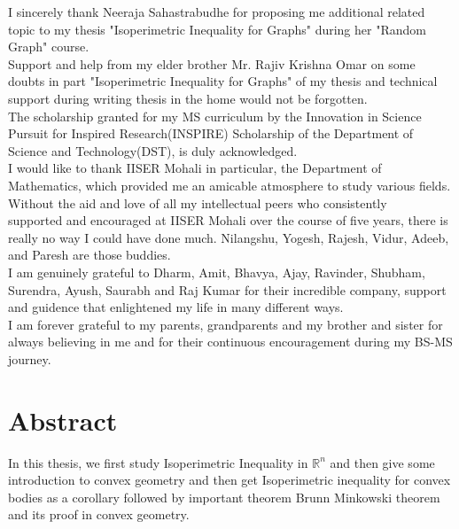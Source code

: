 \documentclass[oneside]{book}
\begin{document}
I sincerely thank Neeraja Sahastrabudhe for proposing me additional related topic to my thesis "Isoperimetric Inequality for Graphs"  during her "Random Graph" course. \\

Support and help from my elder brother Mr. Rajiv Krishna Omar on some doubts in part "Isoperimetric Inequality for Graphs" of my thesis and technical support during writing thesis in the home would not be forgotten.\\

The scholarship granted for my MS curriculum by the Innovation in Science Pursuit for Inspired Research(INSPIRE) Scholarship of the Department of Science and Technology(DST), is duly acknowledged.\\


I would like to thank IISER Mohali in particular, the Department of Mathematics, which provided me an amicable atmosphere to study various fields. \\

Without the aid and love of all my intellectual peers who consistently \\supported and encouraged at IISER Mohali over the course of five years, there is really no way I could have done much. Nilangshu, Yogesh, Rajesh, Vidur, Adeeb, and Paresh are those buddies. 
\\

I am genuinely grateful to Dharm, Amit, Bhavya, Ajay, Ravinder, Shubham, Surendra, Ayush, Saurabh and Raj Kumar for their incredible company,
support and guidence that enlightened my life in many different ways.\\
 
I am forever grateful to my parents, grandparents and my brother and sister for always believing in me and for their continuous encouragement during my BS-MS journey.
\thispagestyle{empty}

\chapter*{Abstract}

In this thesis, we first study Isoperimetric Inequality in $\mathbb{R}^{n}$ and then give some introduction to convex geometry and then get Isoperimetric inequality for convex bodies as a corollary followed by important theorem Brunn Minkowski theorem and its proof in convex geometry.
\end{document}
